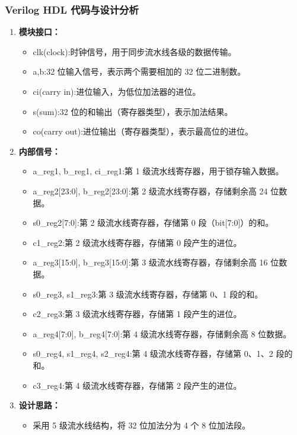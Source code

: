 \documentclass[12pt,a4paper,UTF8]{article}
\begin{document}
\subsubsection{\heiti\bfseries Verilog HDL 代码与设计分析}

\begin{enumerate}
    \item {\heiti\bfseries 模块接口：}
    \begin{itemize}
    \item clk(clock):时钟信号，用于同步流水线各级的数据传输。
    \item a,b:32 位输入信号，表示两个需要相加的 32 位二进制数。
    \item ci(carry in):进位输入，为低位加法器的进位。
    \item s(sum):32 位的和输出（寄存器类型），表示加法结果。
    \item co(carry out):进位输出（寄存器类型），表示最高位的进位。
    \end{itemize}
    \item {\heiti\bfseries 内部信号：}
    \begin{itemize}
    \item a\_reg1, b\_reg1, ci\_reg1:第 1 级流水线寄存器，用于锁存输入数据。
    \item a\_reg2[23:0], b\_reg2[23:0]:第 2 级流水线寄存器，存储剩余高 24 位数据。
    \item s0\_reg2[7:0]:第 2 级流水线寄存器，存储第 0 段（bit[7:0]）的和。
    \item c1\_reg2:第 2 级流水线寄存器，存储第 0 段产生的进位。
    \item a\_reg3[15:0], b\_reg3[15:0]:第 3 级流水线寄存器，存储剩余高 16 位数据。
    \item s0\_reg3, s1\_reg3:第 3 级流水线寄存器，存储第 0、1 段的和。
    \item c2\_reg3:第 3 级流水线寄存器，存储第 1 段产生的进位。
    \item a\_reg4[7:0], b\_reg4[7:0]:第 4 级流水线寄存器，存储剩余高 8 位数据。
    \item s0\_reg4, s1\_reg4, s2\_reg4:第 4 级流水线寄存器，存储第 0、1、2 段的和。
    \item c3\_reg4:第 4 级流水线寄存器，存储第 2 段产生的进位。
    \end{itemize}
    \item {\heiti\bfseries 设计思路：}
    \begin{itemize}
    \item 采用 5 级流水线结构，将 32 位加法分为 4 个 8 位加法段。

\end{itemize}
\end{enumerate}
\end{document}
